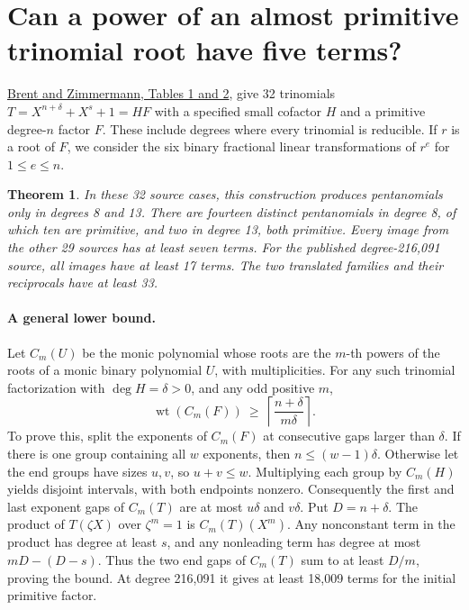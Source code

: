 \documentclass[11pt]{article}
\newtheorem{theorem}{Theorem}
\begin{document}
\clearpage
\section{Can a power of an almost primitive trinomial root have five terms?}
\label{sec:almost-power-windows}

\href{https://maths-people.anu.edu.au/~brent/pd/rpb212.pdf}
{Brent and Zimmermann, Tables 1 and 2}, give 32 trinomials
\(T=X^{n+\delta}+X^s+1=HF\) with a specified small cofactor \(H\)
and a primitive degree-\(n\) factor \(F\). These include degrees
where every trinomial is reducible. If \(r\) is a root of \(F\),
we consider the six binary fractional linear transformations of
\(r^e\) for \(1\le e\le n\).

\begin{theorem}
In these 32 source cases, this construction produces pentanomials
only in degrees 8 and 13. There are fourteen distinct pentanomials
in degree 8, of which ten are primitive, and two in degree 13,
both primitive. Every image from the other 29 sources has
at least seven terms. For the published degree-216,091 source,
all images have at least 17 terms. The two translated families
and their reciprocals have at least 33.
\end{theorem}

\paragraph{A general lower bound.}
Let \(C_m(U)\) be the monic polynomial whose roots are the
\(m\)-th powers of the roots of a monic binary polynomial \(U\),
with multiplicities. For any such trinomial factorization with
\(\deg H=\delta>0\), and any odd positive \(m\),
\[
             \operatorname{wt}(C_m(F))
             \ \ge\ \left\lceil\frac{n+\delta}{m\delta}\right\rceil .
\]
To prove this, split the exponents of \(C_m(F)\) at consecutive
gaps larger than \(\delta\). If there is one group containing all
\(w\) exponents, then \(n\le(w-1)\delta\). Otherwise let the end
groups have sizes \(u,v\), so \(u+v\le w\). Multiplying each
group by \(C_m(H)\) yields disjoint intervals, with both endpoints
nonzero. Consequently the first and last exponent gaps of
\(C_m(T)\) are at most \(u\delta\) and \(v\delta\).
Put \(D=n+\delta\). The product of \(T(\zeta X)\) over
\(\zeta^m=1\) is \(C_m(T)(X^m)\). Any nonconstant term in the
product has degree at least \(s\), and any nonleading term has
degree at most \(mD-(D-s)\). Thus the two end gaps of \(C_m(T)\)
sum to at least \(D/m\), proving the bound. At degree 216,091 it
gives at least 18,009 terms for the initial primitive factor.
\end{document}
